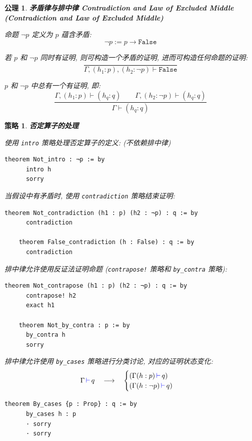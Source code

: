 \documentclass[UTF8]{ctexart}
\DeclareMathOperator{\0}{\mathbf{0}}                    %
\newcommand{\<}{\langle}
\renewcommand{\>}{\rangle}                              %
\newenvironment{thm_box}{
    \begin{tcolorbox}[enhanced, colback=thm_blue2, boxrule=0pt, frame hidden,
        borderline west={0.7mm}{0.1mm}{thm_blue1},breakable]
    }
    {\end{tcolorbox}}
\newenvironment{axm_box}{
    \begin{tcolorbox}[enhanced, colback=axm_yellow2, boxrule=0pt, frame hidden,
        borderline west={0.7mm}{0.1mm}{axm_yellow1},breakable]
    }
    {\end{tcolorbox}}
\theoremstyle{MyStyle} %
\newtheorem{axiom}{公理}[section]
\newenvironment{axm}[2]
{
    \begin{axm_box}
        \begin{axiom}
            \textbf{#1
                \ifx\relax#2\relax\else %
                    (#2) %
                \fi}
            \newline
}
{
        \end{axiom}
    \end{axm_box}
}
\newtheorem{mytactic}{策略}
\newenvironment{tactic}[1]
{
    \begin{thm_box}
        \begin{mytactic}
            \textbf{#1}
            \newline
}
{
        \end{mytactic}
    \end{thm_box}
}
\newcommand*{\lean}[1]{\texttt{\color{blue}#1}}
\newcommand{\Goal}{\texttt{\,\color{leanblue}\ensuremath{\vdash}\,}}
\begin{document}
        \begin{axm}
            {矛盾律与排中律}
            {Contradiction and Law of Excluded Middle}
            命题 $\neg p$ 定义为 $p$ 蕴含矛盾: 
            \[\neg p := p\to\texttt{False}\]

            若 $p$ 和 $\neg p$ 同时有证明, 则可构造一个矛盾的证明, 进而可构造任何命题的证明: 
            \[\frac{}{\Gamma, (h_1 : p), (h_2 : \neg p)\vdash\texttt{False}}\]

            $p$ 和 $\neg p$ 中总有一个有证明, 即: 
            \[\frac{\Gamma,(h_1:p)\vdash (h_q:q)\qquad\Gamma,(h_2:\neg p)\vdash (h_q:q)}{\Gamma\vdash(h_q:q)}\]
        \end{axm}

        \begin{tactic}
            {否定算子的处理}
            使用 \lean{intro} 策略处理否定算子的定义: (不依赖排中律)
            \begin{lstlisting}[style=lean]
    theorem Not_intro : ¬p := by
      intro h
      sorry
            \end{lstlisting}

            当假设中有矛盾时, 使用 \lean{contradiction} 策略结束证明: 
            \begin{lstlisting}[style=lean]
    theorem Not_contradiction (h1 : p) (h2 : ¬p) : q := by
      contradiction

    theorem False_contradiction (h : False) : q := by
      contradiction
            \end{lstlisting}

            排中律允许使用反证法证明命题 (\lean{contrapose!} 策略和 \lean{by\_contra} 策略): 
            \begin{lstlisting}[style=lean]
    theorem Not_contrapose (h1 : p) (h2 : ¬p) : q := by
      contrapose! h2
      exact h1

    theorem Not_by_contra : p := by
      by_contra h
      sorry
            \end{lstlisting}

            排中律允许使用 \lean{by\_cases} 策略进行分类讨论, 对应的证明状态变化: 
            \[\Gamma\Goal q\quad\longrightarrow\quad
            \begin{cases}
                (\Gamma(h : p)\Goal q)\\
                (\Gamma(h : \neg p)\Goal q)
            \end{cases}\]
            \begin{lstlisting}[style=lean]
    theorem By_cases {p : Prop} : q := by
      by_cases h : p
      · sorry
      · sorry
            \end{lstlisting}
        \end{tactic}
        
            
\end{document}
